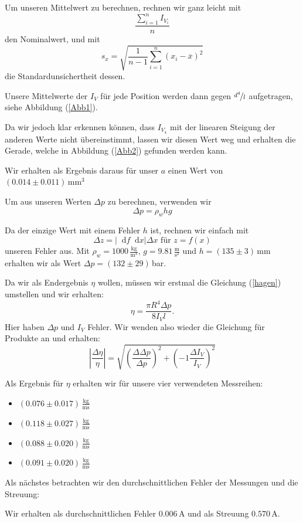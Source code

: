\documentclass[11pt,a4paper]{article}
\newcommand\dif{\mathop{}\!\mathrm{d}}
\begin{document}
Um unseren Mittelwert zu berechnen, rechnen wir ganz leicht mit 
$$
\frac{\sum_{i=1}^n I_{V_i}}{n}
$$
den Nominalwert, und mit
$$
s_x=\sqrt{\frac{1}{n-1}\sum_{i=1}^n(x_i-\overline{x})^2}
$$
die Standardunsichertheit dessen.

Unsere Mittelwerte der $I_V$ f\"ur jede Position werden dann gegen $\nicefrac{d^4}{l}$ aufgetragen, siehe Abbildung (\ref{Abb1}).

Da wir jedoch klar erkennen k\"onnen, dass $I_{V_4}$ mit der linearen Steigung der anderen Werte nicht \"ubereinstimmt, lassen wir diesen Wert weg und erhalten die Gerade, welche in Abbildung (\ref{Abb2}) gefunden werden kann.

Wir erhalten als Ergebnis daraus f\"ur unser $a$ einen Wert von $(0.014\pm0.011)\,\mathrm{mm}^3$

Um aus unseren Werten $\Delta p$ zu berechnen, verwenden wir
$$
\Delta p=\rho_w hg
$$

Da der einzige Wert mit einem Fehler $h$ ist, rechnen wir einfach mit
$$
\Delta z=\left|{\dif f}{\dif x}\right|\Delta x\textrm{ f\"ur }z=f(x)
$$
unseren Fehler aus.
Mit $\rho_w=1000\,\frac{\mathrm{kg}}{\mathrm{m}^3}$, $g=9.81\,\frac{\mathrm{m}}{\mathrm{s}^2}$ und $h=(135\pm3)\,\mathrm{mm}$ erhalten wir als Wert $\Delta p=(132\pm29)\,$bar.

Da wir als Endergebnis $\eta$ wollen, m\"ussen wir erstmal die Gleichung (\ref{hagen}) umstellen und wir erhalten:
$$
\eta=\frac{\pi R^4\Delta p}{8I_V l}.
$$
Hier haben $\Delta p$ und $I_V$ Fehler. Wir wenden also wieder die Gleichung f\"ur Produkte an und erhalten:
$$
\left\vert\frac{\Delta\eta}{\eta}\right\vert=\sqrt{\left(\frac{\Delta\Delta p}{\Delta p}\right)^2+\left(-1\frac{\Delta I_V}{I_V}\right)^2}
$$

Als Ergebnis f\"ur $\eta$ erhalten wir f\"ur unsere vier verwendeten Messreihen:
\begin{itemize}
\item $(0.076\pm0.017)\,\mathrm{\frac{kg}{ms}}$
\item $(0.118\pm0.027)\,\mathrm{\frac{kg}{ms}}$
\item $(0.088\pm0.020)\,\mathrm{\frac{kg}{ms}}$
\item $(0.091\pm0.020)\,\mathrm{\frac{kg}{ms}}$
\end{itemize}


Als n\"achstes betrachten wir den durchschnittlichen Fehler der Messungen und die Streuung:

Wir erhalten als durchschnittlichen Fehler $0.006\,$A und als Streuung $0.570\,$A.
\end{document}
